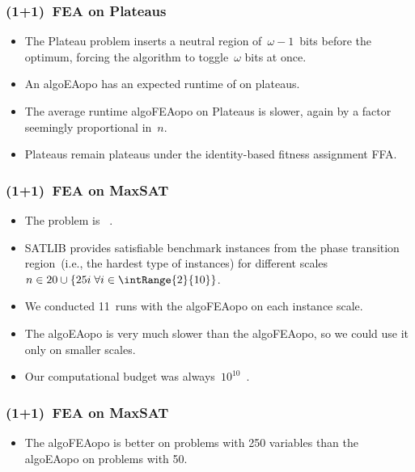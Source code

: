 \documentclass[aspectratio=169,mathserif,notheorems]{beamer}%
\begin{document}
%
\begin{frame}%
\frametitle{(1+1)~FEA on Plateaus}%
\parbox{0.37\paperwidth}{%
\begin{itemize}%
\item The Plateau problem inserts a neutral region of~$\omega-1$~bits before the optimum, forcing the algorithm to toggle~$\omega$ bits at once\cite{AD2018PRAFP}.%
\item<2-> An \gls{algoEAopo} has an expected runtime of  on plateaus\cite{AD2018PRAFP}.%
\item<3-> The average runtime \gls{algoFEAopo} on Plateaus is slower, again by a factor seemingly proportional in~$n$.%
\item<4-> Plateaus remain plateaus under the identity-based fitness assignment FFA.%
\end{itemize}%
}%
%
%
%
%
\end{frame}%
%
\begin{frame}%
\frametitle{(1+1)~FEA on MaxSAT}%
\begin{itemize}%
\item The \cite{HS2004SLSFAA,C1971TCOTPP} problem is \npComplete~\cite{C1971TCOTPP}.%
\item<2-> \gls{SATLIB}\cite{HS2000SAORFROS} provides satisfiable benchmark instances from the phase transition region~(i.e., the hardest type of instances) for different scales~$n\in20 \cup \{25 i\; \forall i \in \intRange{2}{10}\}$.%
\item<3-> We conducted 11~runs with the \gls{algoFEAopo} on each instance scale.%
\item<4-> The \gls{algoEAopo} is very much slower than the \gls{algoFEAopo}, so we could use it only on smaller scales.%
\item<5-> Our computational budget was always~$10^{10}$~.%
\end{itemize}%
%
\end{frame}%
%
\begin{frame}%
\frametitle{(1+1)~FEA on MaxSAT}%
\parbox{0.25\paperwidth}{%
\begin{itemize}%
\item The \gls{algoFEAopo} is better on problems with 250 variables than the \gls{algoEAopo} on problems with 50.%
\end{itemize}%
}%
%
%
%
\end{frame}%
\end{document}
